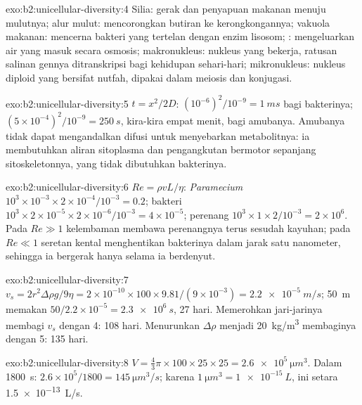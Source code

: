 \begin{solution}{exo:b2:unicellular-diversity:4}
Silia: gerak dan penyapuan makanan menuju mulutnya; alur mulut:
mencorongkan butiran ke kerongkongannya; vakuola makanan: mencerna
bakteri yang tertelan dengan enzim lisosom; :
mengeluarkan air yang masuk secara osmosis; makronukleus: nukleus yang
bekerja, ratusan salinan gennya ditranskripsi bagi kehidupan
sehari-hari; mikronukleus: nukleus diploid yang bersifat nutfah,
dipakai dalam meiosis dan konjugasi.
\end{solution}

\begin{solution}{exo:b2:unicellular-diversity:5}
$t = x^2/2D$: $(10^{-6})^2/10^{-9} = \qty{1}{ms}$ bagi bakterinya;
$(5\times 10^{-4})^2/10^{-9} = \qty{250}{s}$, kira-kira empat menit,
bagi amubanya. Amubanya tidak dapat mengandalkan difusi untuk
menyebarkan metabolitnya: ia membutuhkan aliran sitoplasma dan
pengangkutan bermotor sepanjang sitoskeletonnya, yang tidak dibutuhkan
bakterinya.
\end{solution}

\begin{solution}{exo:b2:unicellular-diversity:6}
$Re = \rho vL/\eta$: \emph{Paramecium} $10^3\times 10^{-3}\times
2\times 10^{-4}/10^{-3} = 0.2$; bakteri $10^3\times 2\times
10^{-5}\times 2\times 10^{-6}/10^{-3} = 4\times 10^{-5}$; perenang
$10^3\times 1\times 2/10^{-3} = 2\times 10^6$. Pada $Re \gg 1$
kelembaman membawa perenangnya terus sesudah kayuhan; pada
$Re \ll 1$ seretan kental menghentikan bakterinya dalam jarak satu
nanometer, sehingga ia bergerak hanya selama ia berdenyut.
\end{solution}

\begin{solution}{exo:b2:unicellular-diversity:7}
$v_s = 2r^2\Delta\rho g/9\eta = 2\times 10^{-10}\times 100\times
9.81/(9\times 10^{-3}) = \qty{2.2e-5}{m/s}$; \qty{50}{m} memakan
$50/2.2\times 10^{-5} = \qty{2.3e6}{s}$, 27 hari. Memerohkan
jari-jarinya membagi $v_s$ dengan 4: 108 hari. Menurunkan $\Delta\rho$
menjadi \qty{20}{kg/m^3} membaginya dengan 5: 135 hari.
\end{solution}

\begin{solution}{exo:b2:unicellular-diversity:8}
$V = \tfrac{4}{3}\pi\times 100\times 25\times 25 =
\qty{2.6e5}{\micro m^3}$. Dalam \qty{1800}{s}: $2.6\times 10^5/1800 =
\qty{145}{\micro m^3/s}$; karena $\qty{1}{\micro m^3} =
\qty{1e-15}{L}$, ini setara \qty{1.5e-13}{L/s}.
\end{solution}

